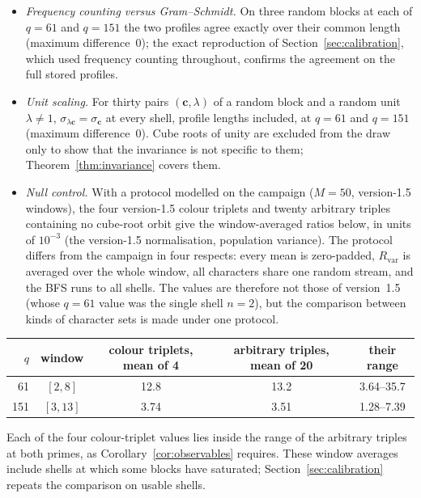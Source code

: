 \documentclass[12pt,a4paper]{article}
\theoremstyle{definition}
\theoremstyle{remark}
\newcommand{\Rvar}{R_{\mathrm{var}}}
\begin{document}
  \begin{itemize}
    \item[(E1)] \emph{Frequency counting versus Gram--Schmidt.}
    On three random blocks at each of $q=61$ and $q=151$ the two profiles agree exactly over their
    common length (maximum difference~$0$); the exact reproduction of
    Section~\ref{sec:calibration}, which used frequency counting throughout, confirms the agreement
    on the full stored profiles.
    \item[(E2)] \emph{Unit scaling.}
    For thirty pairs $(\mathbf c,\lambda)$ of a random block and a random unit $\lambda\neq1$,
    $\sigma_{\lambda\mathbf c}=\sigma_{\mathbf c}$ at every shell, profile lengths included, at $q=61$
    and $q=151$ (maximum difference~$0$).
    Cube roots of unity are excluded from the draw only to show that the invariance is not specific
    to them; Theorem~\ref{thm:invariance} covers them.
    \item[(E3)] \emph{Null control.}
    With a protocol modelled on the campaign ($M=50$, version-1.5 windows), the four version-1.5
    colour triplets and twenty arbitrary triples containing no cube-root orbit give the
    window-averaged ratios below, in units of $10^{-3}$ (the version-1.5 normalisation, population
    variance).
    The protocol differs from the campaign in four respects: every mean is zero-padded, $\Rvar$ is
    averaged over the whole window, all characters share one random stream, and the BFS runs to all
    shells.
    The values are therefore not those of version~1.5 (whose $q=61$ value was the single shell
    $n=2$), but the comparison between kinds of character sets is made under one protocol.
  \end{itemize}

  \begin{center}
    \begin{tabular}{rcccc}
      \toprule
      $q$ & window & colour triplets, mean of 4 & arbitrary triples, mean of 20 & their range \\
      \midrule
      61  & $[2,8]$  & 12.8 & 13.2 & 3.64--35.7 \\
      151 & $[3,13]$ & 3.74 & 3.51 & 1.28--7.39 \\
      \bottomrule
    \end{tabular}
  \end{center}

  Each of the four colour-triplet values lies inside the range of the arbitrary triples at both
  primes, as Corollary~\ref{cor:observables} requires.
  These window averages include shells at which some blocks have saturated; Section~\ref{sec:calibration}
  repeats the comparison on usable shells.
\end{document}
